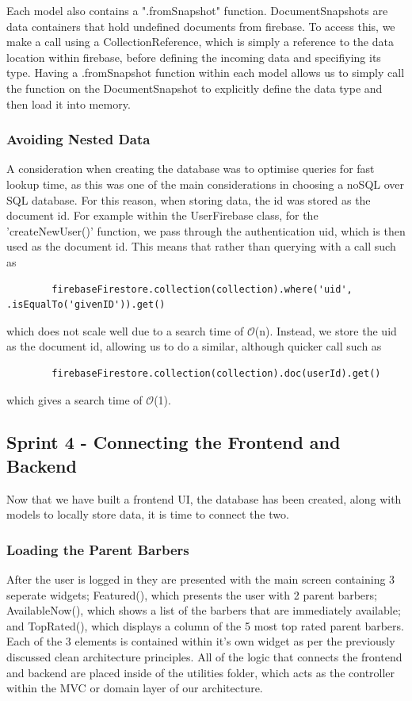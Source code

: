 \documentclass[12pt]{article}
\begin{document}
	Each model also contains a ".fromSnapshot" function. DocumentSnapshots are data containers that hold undefined documents from firebase. To access this, we make a call using a CollectionReference, which is simply a reference to the data location within firebase, before defining the incoming data and specifiying its type. Having a .fromSnapshot function within each model allows us to simply call the function on the DocumentSnapshot to explicitly define the data type and then load it into memory. 
	
	\subsubsection{Avoiding Nested Data}
	A consideration when creating the database was to optimise queries for fast lookup time, as this was one of the main considerations in choosing a noSQL over SQL database. For this reason, when storing data, the id was stored as the document id. For example within the UserFirebase class, for the 'createNewUser()' function, we pass through the authentication uid, which is then used as the document id. This means that rather than querying with a call such as 
	\begin{lstlisting}
		firebaseFirestore.collection(collection).where('uid', .isEqualTo('givenID')).get()
	\end{lstlisting}
	which does not scale well due to a search time of $\mathcal{O}$(n). Instead, we store the uid as the document id, allowing us to do a similar, although quicker call such as
	\begin{lstlisting}
		firebaseFirestore.collection(collection).doc(userId).get()
	\end{lstlisting}
	which gives a search time of $\mathcal{O}$(1).
	
	
	
	
	\subsection{Sprint 4 - Connecting the Frontend and Backend}
	Now that we have built a frontend UI, the database has been created, along with models to locally store data, it is time to connect the two.
	
	\subsubsection{Loading the Parent Barbers}
	After the user is logged in they are presented with the main screen containing 3 seperate widgets; Featured(), which presents the user with 2 parent barbers; AvailableNow(), which shows a list of the barbers that are immediately available; and TopRated(), which displays a column of the 5 most top rated parent barbers. Each of the 3 elements is contained within it's own widget as per the previously discussed clean architecture principles. All of the logic that connects the frontend and backend are placed inside of the utilities folder, which acts as the controller within the MVC or domain layer of our architecture. 
	
\end{document}
